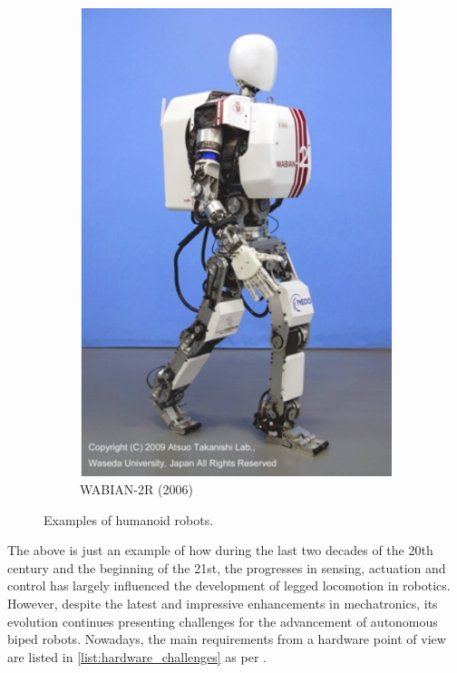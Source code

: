 \begin{figure}[htb]
\begin{subfigure}[b]{0.4\textwidth}
        \includegraphics[width=\textwidth]{figures/waseda2.pdf}
        \caption{WABIAN-2R (2006)}
        \label{fig:waseda_robot2}
    \end{subfigure}
    \caption{Examples of humanoid robots.}
\end{figure}

The above is just an example of how during the last two decades of the 20th century and the beginning of the 21st, the progresses in sensing, actuation and control has largely influenced the development of legged locomotion in robotics.
However, despite the latest and impressive enhancements in mechatronics, its evolution continues presenting challenges for the advancement of autonomous biped robots.
Nowadays, the main requirements from a hardware point of view are listed in \ref{list:hardware_challenges} as per \cite{biped_robots_history}.

